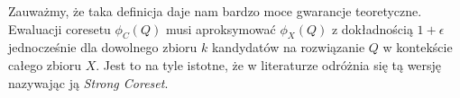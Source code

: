 \noindent
Zauważmy, że taka definicja daje nam bardzo moce gwarancje teoretyczne.
Ewaluacji coresetu $\phi_{C}(Q)$ musi aproksymować $\phi_{X}(Q)$ z dokładnością $1+\epsilon$ jednocześnie dla dowolnego zbioru $k$ kandydatów na rozwiązanie $Q$ w kontekście całego zbioru $X$.
Jest to na tyle istotne, że w literaturze odróżnia się tą wersję nazywając ją \textit{Strong Coreset}.

\noindent